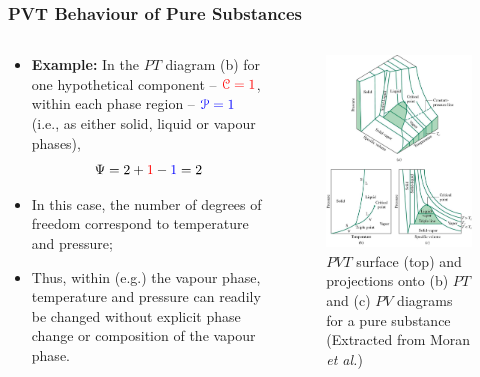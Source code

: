 \documentclass[10pt,compress]{beamer}
\begin{document}
\begin{frame}
 \frametitle{PVT Behaviour of Pure Substances}
 \begin{columns}
  \begin{column}[l]{0.5\linewidth}
\begin{itemize}
\item <1-> {\bf Example:} In the $PT$ diagram (b) for one hypothetical component -- $\textcolor{red}{\mathcal{C}=1}$, within each phase region -- $\textcolor{blue}{\mathcal{P}=1}$ (i.e., as either solid, liquid or vapour phases),
\begin{displaymath}
\Psi = 2 + \textcolor{red}{1} - \textcolor{blue}{1} = 2
\end{displaymath}
\item <2-> In this case, the number of degrees of freedom correspond to temperature and pressure;
\item <3-> Thus, within (e.g.) the vapour phase, temperature and pressure can readily be changed without explicit phase change or composition of the vapour phase.
\end{itemize}
  \end{column}
  \begin{column}[l]{0.5\linewidth}
   \begin{figure}%
    \begin{center}
     \includegraphics[width=4.cm,clip]{./Pics/PVT_Surface.jpg}
    \end{center}
\caption{$PVT$ surface (top) and projections onto (b) $PT$ and (c) $PV$ diagrams for a pure substance (Extracted from Moran {\it et al.})}
   \end{figure}    
  \end{column}
 \end{columns}
\end{frame}


\end{document}
